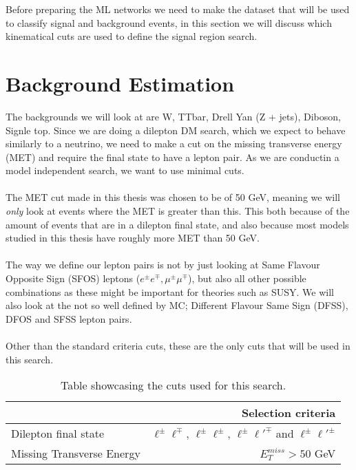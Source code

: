 \documentclass[14pt, a4paper]{book}
\begin{document}
Before preparing the ML networks we need to make the dataset that will be used to classify signal and background events, in this section we will discuss which kinematical cuts are used to define the signal region search. 




\section{Background Estimation}
The backgrounds we will look at are W, TTbar, Drell Yan (Z + jets), Diboson, Signle top. Since we are doing a dilepton DM search, which we expect to behave similarly to a neutrino, 
we need to make a cut on the missing transverse energy (MET) and require the final state to have a lepton pair. As we are conductin a model independent search, we want to use minimal cuts.\\
\\The MET cut made in this thesis was chosen to be of 50 GeV, meaning we will \textit{only} look at events where the MET is greater than this. 
This both because of the amount of events that are in a dilepton final state, and also because most models studied in this thesis have roughly more MET than 50 GeV.\\
\\The way we define our lepton pairs is not by just looking at Same Flavour Opposite Sign (SFOS) leptons ($e^\pm e^\mp, \mu^\pm\mu^\mp$), but also all other possible combinations as these might be important for theories such as SUSY.
We will also look at the not so well defined by MC; Different Flavour Same Sign (DFSS), DFOS and SFSS lepton pairs. \\
\\Other than the standard criteria cuts, these are the only cuts that will be used in this search.
\begin{table}[!h]
    \centering
    \begin{tabular}{l|r}\midrule\midrule
                                                                                & Selection criteria        \\\midrule
        Dilepton final state                                                    & $\ell^\pm \ell^\mp$, $\ell^\pm \ell^\pm$, $\ell^\pm \ell'^\mp$ and $\ell^\pm \ell'^\pm$    \\
        Missing Transverse Energy                                               & $E_T^{miss} > 50$ GeV     \\\midrule\midrule
    \end{tabular}
    \caption[Cuts for model-indepentent search]{Table showcasing the cuts used for this search.}
    \label{tab:MI_Cuts}
\end{table}
\end{document}
